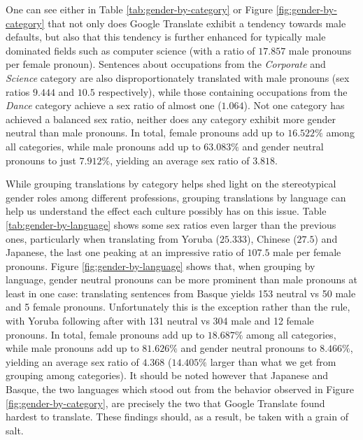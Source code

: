 \documentclass[fleqn,10pt]{article}
\begin{document}
One can see either in Table \ref{tab:gender-by-category} or Figure \ref{fig:gender-by-category} that not only does Google Translate exhibit a tendency towards male defaults, but also that this tendency is further enhanced for typically male dominated fields such as computer science (with a ratio of $17.857$ male pronouns per female pronoun). Sentences about occupations from the \emph{Corporate} and \emph{Science} category are also disproportionately translated with male pronouns (sex ratios $9.444$ and $10.5$ respectively), while those containing occupations from the \emph{Dance} category achieve a sex ratio of almost one ($1.064$). Not one category has achieved a balanced sex ratio, neither does any category exhibit more gender neutral than male pronouns. In total, female pronouns add up to $16.522\%$ among all categories, while male pronouns add up to $63.083\%$ and gender neutral pronouns to just $7.912\%$, yielding an average sex ratio of $3.818$.

While grouping translations by category helps shed light on the stereotypical gender roles among different professions, grouping translations by language can help us understand the effect each culture possibly has on this issue. Table \ref{tab:gender-by-language} shows some sex ratios even larger than the previous ones, particularly when translating from Yoruba ($25.333$), Chinese ($27.5$) and Japanese, the last one peaking at an impressive ratio of $107.5$ male per female pronouns. Figure \ref{fig:gender-by-language} shows that, when grouping by language, gender neutral pronouns can be more prominent than male pronouns at least in one case: translating sentences from Basque yields 153 neutral vs 50 male and 5 female pronouns. Unfortunately this is the exception rather than the rule, with Yoruba following after with 131 neutral vs 304 male and 12 female pronouns. In total, female pronouns add up to $18.687\%$ among all categories, while male pronouns add up to $81.626\%$ and gender neutral pronouns to $8.466\%$, yielding an average sex ratio of $4.368$ ($14.405\%$ larger than what we get from grouping among categories). It should be noted however that Japanese and Basque, the two languages which stood out from the behavior observed in Figure \ref{fig:gender-by-category}, are precisely the two that Google Translate found hardest to translate. These findings should, as a result, be taken with a grain of salt.
\end{document}
